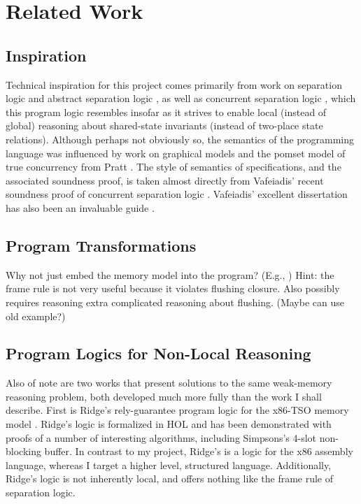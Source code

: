 \documentclass[11pt]{report}
\begin{document}
\chapter{Related Work}

\section{Inspiration}

Technical inspiration for this project comes primarily from work on separation logic \cite{DBLP:conf/lics/Reynolds02,DBLP:conf/csl/OHearnRY01,DBLP:journals/bsl/OHearnP99} and abstract separation logic \cite{DBLP:conf/lics/CalcagnoOY07}, as well as concurrent separation logic  \cite{DBLP:journals/tcs/OHearn07,DBLP:journals/tcs/Brookes07}, which this program logic resembles insofar as it strives to enable local (instead of global) reasoning about shared-state invariants (instead of two-place state relations). Although perhaps not obviously so, the semantics of the programming language was influenced by work on graphical models \cite{DBLP:journals/ipl/WehrmanHO09,DBLP:conf/RelMiCS/HoareMSW09,DBLP:journals/jlp/HoareMSW11} and the pomset model of true concurrency from Pratt \cite{DBLP:conf/popl/Pratt82,DBLP:conf/concur/Pratt84}. The style of semantics of specifications, and the associated soundness proof, is taken almost directly from Vafeiadis' recent soundness proof of concurrent separation logic \cite{V11}. Vafeiadis' excellent dissertation has also been an invaluable guide \cite{VafeiadisDissertation}. 

\section{Program Transformations}

Why not just embed the memory model into the program? (E.g., \cite{DBLP:conf/tphol/Ridge07}) Hint: the frame rule is not very useful because it violates flushing closure. Also possibly requires reasoning extra complicated reasoning about flushing.  (Maybe can use old example?)


\section{Program Logics for Non-Local Reasoning}

Also of note are two works that present solutions to the same weak-memory reasoning problem, both developed much more fully than the work I shall describe. First is Ridge's rely-guarantee program logic for the x86-TSO memory model \cite{DBLP:conf/vstte/Ridge10}. Ridge's logic is formalized in HOL and has been demonstrated with proofs of a number of interesting algorithms, including Simpsons's 4-slot non-blocking buffer. In contrast to my project, Ridge's is a logic for the x86 assembly language, whereas I target a higher level, structured language. Additionally, Ridge's logic is not inherently local, and offers nothing like the frame rule of separation logic. 
\end{document}
